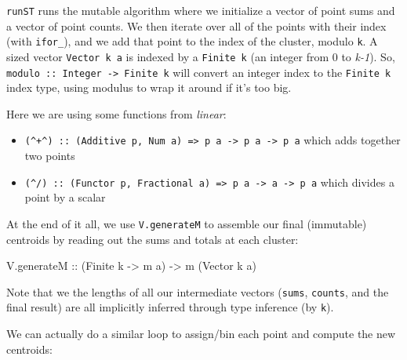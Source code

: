 \documentclass[]{article}
\newenvironment{Shaded}{}{}
\newcommand{\DataTypeTok}[1]{\textcolor[rgb]{0.56,0.13,0.00}{#1}}
\newcommand{\NormalTok}[1]{#1}
\newcommand{\OtherTok}[1]{\textcolor[rgb]{0.00,0.44,0.13}{#1}}
\begin{document}
\texttt{runST} runs the mutable algorithm where we initialize a vector of point
sums and a vector of point counts. We then iterate over all of the points with
their index (with \texttt{ifor\_}), and we add that point to the index of the
cluster, modulo \texttt{k}. A sized vector \texttt{Vector\ k\ a} is indexed by a
\texttt{Finite\ k} (an integer from 0 to \emph{k-1}). So,
\texttt{modulo\ ::\ Integer\ -\textgreater{}\ Finite\ k} will convert an integer
index to the \texttt{Finite\ k} index type, using modulus to wrap it around if
it's too big.

Here we are using some functions from \emph{linear}:

\begin{itemize}
\tightlist
\item
  \texttt{(\^{}+\^{})\ ::\ (Additive\ p,\ Num\ a)\ =\textgreater{}\ p\ a\ -\textgreater{}\ p\ a\ -\textgreater{}\ p\ a}
  which adds together two points
\item
  \texttt{(\^{}/)\ ::\ (Functor\ p,\ Fractional\ a)\ =\textgreater{}\ p\ a\ -\textgreater{}\ a\ -\textgreater{}\ p\ a}
  which divides a point by a scalar
\end{itemize}

At the end of it all, we use \texttt{V.generateM} to assemble our final
(immutable) centroids by reading out the sums and totals at each cluster:

\begin{Shaded}
\begin{Highlighting}[]
\NormalTok{V.generateM}\OtherTok{ ::}\NormalTok{ (}\DataTypeTok{Finite}\NormalTok{ k }\OtherTok{{-}\textgreater{}}\NormalTok{ m a) }\OtherTok{{-}\textgreater{}}\NormalTok{ m (}\DataTypeTok{Vector}\NormalTok{ k a)}
\end{Highlighting}
\end{Shaded}

Note that we the lengths of all our intermediate vectors (\texttt{sums},
\texttt{counts}, and the final result) are all implicitly inferred through type
inference (by \texttt{k}).

We can actually do a similar loop to assign/bin each point and compute the new
centroids:
\end{document}

